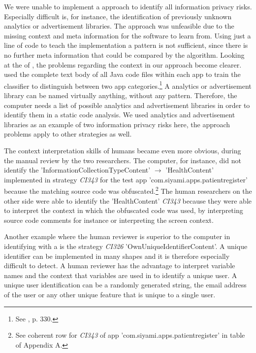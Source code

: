 We were unable to implement a \ml approach to identify all information privacy risks.
Especially difficult is, for instance, the identification of previously unknown analytics or advertisement libraries.
The \ml approach was unfeasible due to the missing context and meta information for the software to learn from.
Using just a line of code to teach the \ml implementation a pattern is not sufficient, since there is no further meta information that could be compared by the algorithm.
Looking at the \ml of \textcite{Shabtai2010}, the problems regarding the context in our approach become clearer.
\textcite{Shabtai2010} used the complete text body of all Java code files within each app to train the \ml classifier to distinguish between two app categories.\footnote{See \cite{Shabtai2010}, p. 330.}
A analytics or advertisement library can be named virtually anything, without any pattern.
Therefore, the computer needs a list of possible analytics and advertisement libraries in order to identify them in a static code analysis.
We used analytics and advertisement libraries as an example of two information privacy risks here, the \ml approach problems apply to other \ipr strategies as well.

The context interpretation skills of humans became even more obvious, during the manual review by the two researchers.
The computer, for instance, did not identify the \ipr 'InformationCollectionTypeContent' $\rightarrow$ 'HealthContent' implemented in strategy \textit{CI343} for the test app 'com.siyami.apps.patientregister' because the matching source code was obfuscated.\footnote{See coherent row for \textit{CI343} of app 'com.siyami.apps.patientregister'  in table of Appendix A.}
The human researchers on the other side were able to identify the 'HealthContent' \textit{CI343} \ipr because they were able to interpret the context in which the obfuscated code was used, by interpreting source code comments for instance or interpreting the screen context.

Another example where the human reviewer is superior to the computer in identifying \ipr with a \sca is the strategy \textit{CI326} 'OwnUniqueIdentifierContent'.
A unique identifier can be implemented in many shapes and it is therefore especially difficult to detect.
A human reviewer has the advantage to interpret variable names and the context that variables are used in to identify a unique user.
A unique user identification can be a randomly generated string, the email address of the user or any other unique feature that is unique to a single user.

